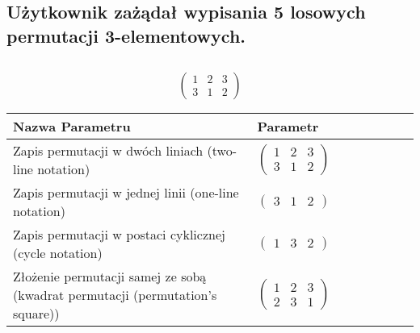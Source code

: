 \documentclass[12pt]{article}
\begin{document}
\subsection*{Użytkownik zażądał wypisania 5 losowych permutacji 3-elementowych.}

\subsection{}
\begin{center}
\[
\begin{pmatrix}
	1 & 2 & 3 \\ 
	3 & 1 & 2 
\end{pmatrix}
\]

\begin{tabular}{|m{0.6\linewidth}|m{0.4\linewidth}|}
	\hline
	Nazwa Parametru & Parametr \\
	\hline
	Zapis permutacji w dwóch liniach (two-line notation) & $\begin{pmatrix} 1 & 2 & 3 \\ 
3 & 1 & 2 \end{pmatrix}$ \\ 
	\hline
	Zapis permutacji w jednej linii (one-line notation) & $\begin{pmatrix} 3 & 1 & 2 \end{pmatrix}$ \\ 
	\hline
	Zapis permutacji w postaci cyklicznej (cycle notation) & $\begin{pmatrix} 1 & 3 & 2 \end{pmatrix} $ \\ 
	\hline
	Złożenie permutacji samej ze sobą (kwadrat permutacji (permutation's square)) & $\begin{pmatrix} 1 & 2 & 3 \\ 
2 & 3 & 1 \end{pmatrix}$ \\ 
	\hline
\end{tabular}
\end{center}
\end{document}
